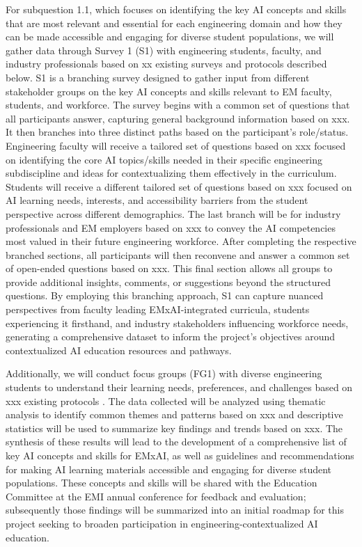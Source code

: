 \documentclass[11pt]{article}
\begin{document}
For subquestion 1.1, which focuses on identifying the key AI concepts and skills that are most relevant and essential for each engineering domain and how they can be made accessible and engaging for diverse student populations, we will gather data through Survey 1 (S1) with engineering students, faculty, and industry professionals based on xx existing surveys and protocols described below. 
S1 is a branching survey designed to gather input from different stakeholder groups on the key AI concepts and skills relevant to EM faculty, students, and workforce. 
The survey begins with a common set of questions that all participants answer, capturing general background information based on xxx.
It then branches into three distinct paths based on the participant's role/status.
Engineering faculty will receive a tailored set of questions based on xxx focused on identifying the core AI topics/skills needed in their specific engineering subdiscipline and ideas for contextualizing them effectively in the curriculum.
Students will receive a different tailored set of questions based on xxx focused on AI learning needs, interests, and accessibility barriers from the student perspective across different demographics.
The last branch will be for industry professionals and EM employers based on xxx to convey the AI competencies most valued in their future engineering workforce. 
After completing the respective branched sections, all participants will then reconvene and answer a common set of open-ended questions based on xxx. 
This final section allows all groups to provide additional insights, comments, or suggestions beyond the structured questions.
By employing this branching approach, S1 can capture nuanced perspectives from faculty leading EMxAI-integrated curricula, students experiencing it firsthand, and industry stakeholders influencing workforce needs, generating a comprehensive dataset to inform the project's objectives around contextualized AI education resources and pathways.
 
Additionally, we will conduct focus groups (FG1) with diverse engineering students to understand their learning needs, preferences, and challenges based on xxx existing protocols \cite{xxx}. 
The data collected will be analyzed using thematic analysis to identify common themes and patterns based on xxx and descriptive statistics will be used to summarize key findings and trends based on xxx. 
The synthesis of these results will lead to the development of a comprehensive list of key AI concepts and skills for EMxAI, as well as guidelines and recommendations for making AI learning materials accessible and engaging for diverse student populations. 
These concepts and skills will be shared with the Education Committee at the EMI annual conference for feedback and evaluation; subsequently those findings will be summarized into an initial roadmap for this project seeking to broaden participation in engineering-contextualized AI education.
\end{document}
